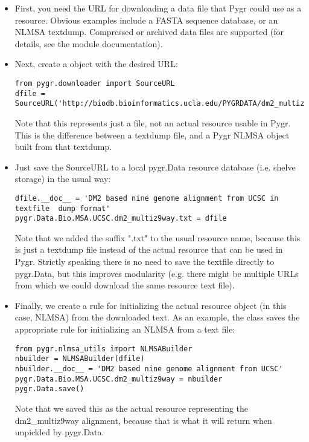 \documentclass{howto}
\begin{document}
\begin{itemize}
\item First, you need the URL for downloading a data file that 
Pygr could use as a resource.  Obvious examples include a FASTA
sequence database, or an NLMSA textdump.  Compressed or archived
data files are supported (for details, see the 
module documentation).

\item Next, create a  object with the desired URL:
\begin{verbatim}
from pygr.downloader import SourceURL
dfile = SourceURL('http://biodb.bioinformatics.ucla.edu/PYGRDATA/dm2_multiz9way.txt.gz')
\end{verbatim}
Note that this represents just a file, not an actual resource usable
in Pygr.  This is the difference between a textdump file, and a 
Pygr NLMSA object built from that textdump.

\item Just save the SourceURL to a local pygr.Data resource
database (i.e. shelve storage) in the usual way:
\begin{verbatim}
dfile.__doc__ = 'DM2 based nine genome alignment from UCSC in textfile  dump format'
pygr.Data.Bio.MSA.UCSC.dm2_multiz9way.txt = dfile
\end{verbatim}
Note that we added the suffix ".txt" to the usual resource name, because
this is just a textdump file instead of the actual resource that can be
used in Pygr.  Strictly speaking there is no need to save the textfile
directly to pygr.Data, but this improves modularity (e.g. there might
be multiple URLs from which we could download the same resource text file).

\item Finally, we create a rule for initializing the actual resource
object (in this case, NLMSA) from the downloaded text.  As an example,
the  class saves the appropriate rule for 
initializing an NLMSA from a text file:
\begin{verbatim}
from pygr.nlmsa_utils import NLMSABuilder
nbuilder = NLMSABuilder(dfile)
nbuilder.__doc__ = 'DM2 based nine genome alignment from UCSC'
pygr.Data.Bio.MSA.UCSC.dm2_multiz9way = nbuilder
pygr.Data.save() 
\end{verbatim}
Note that we saved this as the actual resource representing the
dm2_multiz9way alignment, because that is what it will return
when unpickled by pygr.Data.


\end{itemize}
\end{document}
